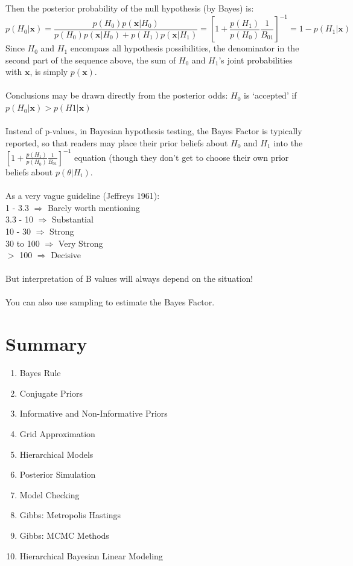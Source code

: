 \documentclass[12pt]{book}
\begin{document}
Then the posterior probability of the null hypothesis (by Bayes) is:
\begin{equation}
p(H_0|\textbf{x}) = \frac{p(H_0)p(\textbf{x}|H_0)}{p(H_0)p(\textbf{x} | H_0) + p(H_1)p(\textbf{x}|H_1)} = 
[1+ \frac{p(H_1)}{p(H_0)} \frac{1}{B_{01}}]^{-1} = 1 - p(H_1|\textbf{x})
\end{equation}
Since $H_0$ and $H_1$ encompass all hypothesis possibilities, the denominator in the second part of the sequence above, the sum of $H_0$ and $H_1$'s joint probabilities with $\textbf{x}$, is simply $p(\textbf{x})$.
\\\\
Conclusions may be drawn directly from the posterior odds: $H_0$ is `accepted' if $p(H_0|\textbf{x}) > p(H1|\textbf{x})$
\\\\
Instead of p-values, in Bayesian hypothesis testing, the Bayes Factor is typically reported, so that readers may place their prior beliefs about $H_0$ and $H_1$ into the $[1+ \frac{p(H_1)}{p(H_0)} \frac{1}{B_{01}}]^{-1}$ equation (though they don't get to choose their own prior beliefs about $p(\theta|H_i)$.
\\\\
As a very vague guideline (Jeffreys 1961):\\
1 - 3.3 $\Rightarrow$ Barely worth mentioning \\
3.3 - 10 $\Rightarrow$ Substantial \\
10 - 30 $\Rightarrow$ Strong \\
30 to 100 $\Rightarrow$ Very Strong \\
$>$ 100 $\Rightarrow$ Decisive \\
\\
But interpretation of B values will always depend on the situation!
\\\\
You can also use sampling to estimate the Bayes Factor.




\chapter{Summary}


\begin{enumerate}
\item Bayes Rule
\item Conjugate Priors
\item Informative and Non-Informative Priors
\item Grid Approximation
\item Hierarchical Models
\item Posterior Simulation
\item Model Checking
\item Gibbs: Metropolis Hastings
\item Gibbs: MCMC Methods
\item Hierarchical Bayesian Linear Modeling 
\end{enumerate}
\end{document}
